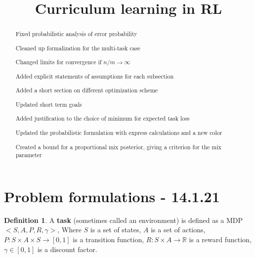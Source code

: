\documentclass[letterpaper]{article}
\title{Curriculum learning in RL}
\theoremstyle{definition}
\newtheorem{defn}{Definition}[section]
\begin{document}
	
	\maketitle
	\begin{abstract}
		
		Fixed probabilistic analysis of error probability
		
		Cleaned up formalization for the multi-task case
		
		Changed limits for convergence if $n/m\rightarrow\infty$
		
		Added explicit statements of assumptions for each subsection
		
		Added a short section on different optimization scheme
		
		Updated short term goals
		
		Added justification to the choice of minimum for expected task loss
		
		Updated the probabilistic formulation with express calculations and a new color
		
		Created a bound for a proportional mix posterior, giving a criterion for the mix parameter
	\end{abstract}

\tableofcontents

\section{Problem formulations - 14.1.21} \label{sec:formulation}
\begin{defn}
	A \textbf{task} (sometimes called an environment) is defined as a MDP $<S,A,P,R,\gamma>$,
	Where $S$ is a set of states, $A$ is a set of actions, $P:S\times A\times S\rightarrow [0,1]$ is a transition function, 
	$R:S\times A\rightarrow \mathbb{R}$ is a reward function, $\gamma\in[0,1]$ is a discount factor.
\end{defn}
\end{document}

